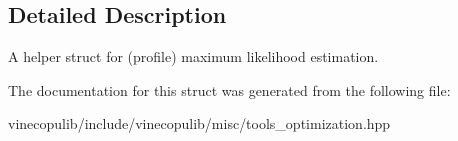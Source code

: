\subsection{Detailed Description}
A helper struct for (profile) maximum likelihood estimation. 

The documentation for this struct was generated from the following file\+:\begin{DoxyCompactItemize}
\item 
vinecopulib/include/vinecopulib/misc/tools\+\_\+optimization.\+hpp\end{DoxyCompactItemize}
